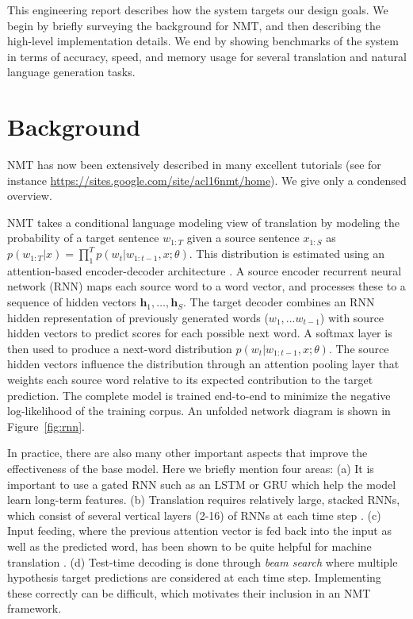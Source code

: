\documentclass[]{article}
\begin{document}
This engineering report describes how the system targets our design
goals. We begin by briefly surveying the background for NMT, and then
describing the high-level implementation details. We end by showing
benchmarks of the system in terms of accuracy, speed, and memory usage
for several translation and natural language generation tasks.

\section{Background}

NMT has now been extensively described in many
excellent tutorials (see for instance
\url{https://sites.google.com/site/acl16nmt/home}). We give only
a condensed overview.

NMT takes a conditional language modeling view of translation by modeling the
probability of a target sentence $w_{1:T}$ given a source sentence
$x_{1:S}$ as
$p(w_{1:T}| x) = \prod_{1}^T p(w_t| w_{1:t-1}, x; \theta)$. This
distribution is estimated using an attention-based encoder-decoder
architecture \citep{Bahdanau2015}. A source encoder recurrent neural
network (RNN) maps each source word to a word vector, and processes
these to a sequence of hidden vectors
$\mathbf{h}_1, \ldots, \mathbf{h}_S$.  The target decoder combines an
RNN hidden representation of previously generated words
($w_1, ... w_{t-1}$) with source hidden vectors to predict scores for
each possible next word. A softmax layer is then used to produce a
next-word distribution $ p(w_t| w_{1:t-1}, x; \theta)$. The source
hidden vectors influence the distribution through an attention pooling
layer that weights each source word relative to its expected
contribution to the target prediction. The complete model is trained
end-to-end to minimize the negative log-likelihood of the training
corpus. An unfolded network diagram is shown in Figure~\ref{fig:rnn}.


In practice, there are also many other important aspects that improve
the effectiveness of the base model. Here we briefly mention four
areas: (a) It is important to use a gated RNN such as an LSTM
\citep{hochreiter1997long} or GRU \citep{chung2014empirical} which help
the model learn long-term features. (b) Translation requires
relatively large, stacked RNNs, which consist of several vertical
layers (2-16) of RNNs at each time step \citep{sutskever14sequence}. (c)
Input feeding, where the previous attention vector is fed back into
the input as well as the predicted word, has been shown to be quite
helpful for machine translation \citep{Luong2015}.  (d) Test-time
decoding is done through \textit{beam search} where multiple
hypothesis target predictions are considered at each time
step. Implementing these correctly can be difficult, which motivates
their inclusion in an NMT framework.
\end{document}
